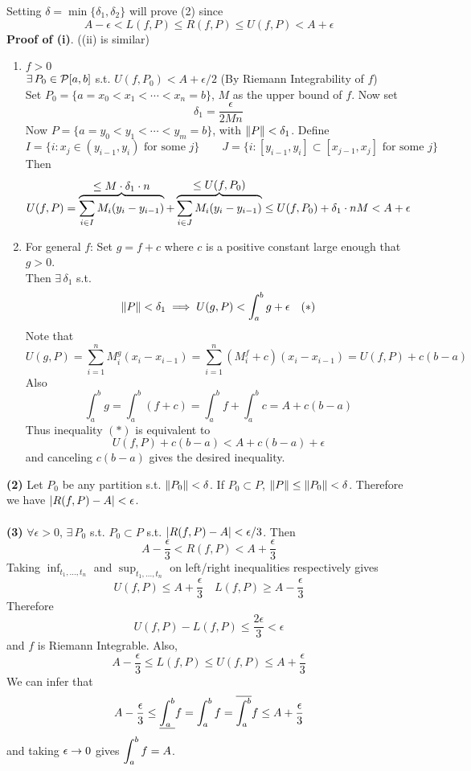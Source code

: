 Setting $\delta = \min \{\delta_1, \delta_2\}$ will prove (2) since
$$ A-\epsilon < L(f, P) \leq R(f, P) \leq U(f, P) < A+\epsilon $$
\textbf{Proof of (i)}. ((ii) is similar)
\begin{enumerate}
	\item $f > 0$\\
	$\exists\,P_0\in \mathcal{P}[a, b]$ s.t. $U(f, P_0) < A+\epsilon / 2$ (By Riemann Integrability of $f$)\\
	Set $P_0= \{a = x_0 < x_1 < \cdots < x_n = b\}$, $M$ as the upper bound of $f$. Now set $$\delta_1 = \frac{\epsilon}{2Mn}$$
	Now $P = \{a = y_0 < y_1 <\cdots < y_m=b \}$, with $\left\lVert P\right\rVert <\delta_1$. Define
	$$ I = \{i: x_j \in (y_{i-1}, y_{i}) \text{ for some }j\} \qquad J = \{i:[y_{i-1}, y_i]\subset [x_{j-1}, x_j] \text{ for some } j \}$$
	Then
	$$U(f, P) = \overbrace{\sum_{i\in I} M_i(y_i - y_{i - 1})}^{\displaystyle \leq M \cdot \delta_1\cdot n}+ \overbrace{\sum_{i\in J} M_i(y_i - y_{i-1})}^{\displaystyle \leq U(f, P_0)} \leq U(f, P_0) + \delta_1 \cdot nM < A+ \epsilon$$
	\item For general $f$: Set $g = f+c$ where $c$ is a positive constant large enough that $g > 0$.\\
	Then $\exists\, \delta_1$ s.t.
	$$\left\lVert P\right\rVert < \delta_1 \implies U(g, P) < \int_a^b g + \epsilon \quad (*)$$
	Note that $$U(g, P) = \sum_{i=1}^n M_i^g (x_i -x_{i-1}) = \sum_{i=1}^{n} (M_i^f + c)(x_i-x_{i-1}) = U(f, P) + c(b-a)$$
	Also
	$$\int_a^b g = \int_a^b (f+c) = \int_a^b f + \int_a^b c = A + c(b-a)$$
	Thus inequality $(*)$ is equivalent to
	$$U(f, P) + c(b-a) < A + c(b-a) + \epsilon$$
	and canceling $c(b-a)$ gives the desired inequality.
\end{enumerate}
\textbf{(2)} Let $P_0$ be any partition s.t. $\left\lVert P_0\right\rVert < \delta$. If $P_0\subset P$, $\left\lVert P\right\rVert \leq \left\lVert P_0\right\rVert<\delta$. Therefore we have $\left|R(f, P) - A\right| < \epsilon$.\\
\\
\textbf{(3)} $\forall \epsilon > 0$, $\exists\,P_0$ s.t. $P_0\subset P$ s.t. $\left|R(f, P) - A\right| < \epsilon / 3$. Then
$$A  - \frac{\epsilon}{3} < R(f, P) < A + \frac{\epsilon}{3}$$
Taking $\inf_{t_1, \dots, t_n}$ and $\sup_{t_1, \dots, t_n}$ on left/right inequalities respectively gives
$$ U(f, P) \leq A + \frac{\epsilon}{3} \quad L(f, P) \geq A - \frac{\epsilon}{3}$$
Therefore
$$U(f, P) - L(f, P) \leq \frac{2\epsilon}{3} <\epsilon$$
and $f$ is Riemann Integrable. Also,
$$ A - \frac{\epsilon}{3} \leq L(f, P) \leq U(f, P) \leq A+\frac{\epsilon}{3}$$
We can infer that
$$A - \frac{\epsilon}{3} \leq \underline{\int_a^b} f = \int_a^b f = \overline{\int_a^b} f \leq A +\frac{\epsilon}{3}$$
and taking $\epsilon\rightarrow0$ gives $\displaystyle \int_a^b f= A$.
\pagebreak